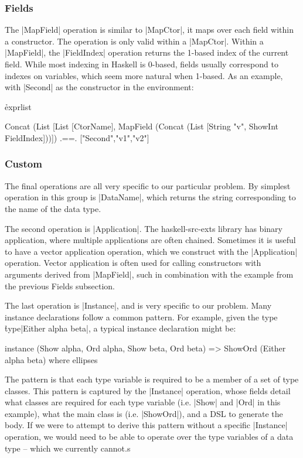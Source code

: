 \documentclass[preprint,draft]{sigplanconf}
\begin{document}
\subsubsection{Fields}

The |MapField| operation is similar to |MapCtor|, it maps over each field within a constructor. The operation is only valid within a |MapCtor|. Within a |MapField|, the |FieldIndex| operation returns the 1-based index of the current field. While most indexing in Haskell is 0-based, fields usually correspond to indexes on variables, which seem more natural when 1-based. As an example, with |Second| as the constructor in the environment:

\h{exprlist}\begin{code}
Concat (List [List [CtorName],
    MapField (Concat (List [String "v", ShowInt FieldIndex]))])
    .==. ["Second","v1","v2"]
\end{code}

\subsubsection{Custom}

The final operations are all very specific to our particular problem. By simplest operation in this group is |DataName|, which returns the string corresponding to the name of the data type.

The second operation is |Application|. The haskell-src-exts library has binary application, where multiple applications are often chained. Sometimes it is useful to have a vector application operation, which we construct with the |Application| operation. Vector application is often used for calling constructors with arguments derived from |MapField|, such in combination with the example from the previous Fields subsection.

The last operation is |Instance|, and is very specific to our problem. Many instance declarations follow a common pattern. For example, given the type \h{type}|Either alpha beta|, a typical instance declaration might be:

\ignore\begin{code}
instance (Show alpha, Ord alpha, Show beta, Ord beta) =>
    ShowOrd (Either alpha beta) where ellipses
\end{code}

The pattern is that each type variable is required to be a member of a set of type classes. This pattern is captured by the |Instance| operation, whose fields detail what classes are required for each type variable (i.e. |Show| and |Ord| in this example), what the main class is (i.e. |ShowOrd|), and a DSL to generate the body. If we were to attempt to derive this pattern without a specific |Instance| operation, we would need to be able to operate over the type variables of a data type -- which we currently cannot.s
\end{document}
